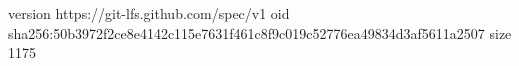 version https://git-lfs.github.com/spec/v1
oid sha256:50b3972f2ce8e4142c115e7631f461c8f9c019c52776ea49834d3af5611a2507
size 1175
